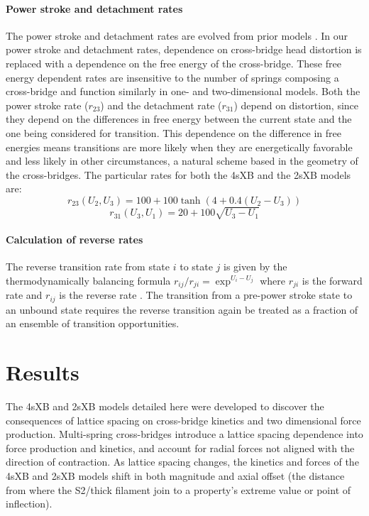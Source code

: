 \documentclass[]{article}
\begin{document}
\paragraph{Power stroke and detachment rates} %
The power stroke and detachment rates are evolved from prior models \citep{Pate1989, Tanner2007}. 
In our power stroke and detachment rates, dependence on cross-bridge head distortion is replaced with a dependence on the free energy of the cross-bridge.
These free energy dependent rates are insensitive to the number of springs composing a cross-bridge and function similarly in one- and two-dimensional models. 
Both the power stroke rate ($r_{23}$) and the detachment rate ($r_{31}$) depend on distortion, since they depend on the differences in free energy between the current state and the one being considered for transition.  
This dependence on the difference in free energies means transitions are more likely when they are energetically favorable and less likely in other circumstances, a natural scheme based in the geometry of the cross-bridges.
The particular rates for both the 4sXB and the 2sXB models are: 
$$r_{23}(U_2, U_3) = 100 + 100\tanh(4 + 0.4 (U_2 - U_3)) $$
$$r_{31}(U_3, U_1) = 20 + 100 \sqrt{U_3 - U_1} $$

\paragraph{Calculation of reverse rates} %
The reverse transition rate from state $i$ to state $j$ is given by the thermodynamically balancing formula $r_{ij}/r_{ji}=\exp^{U_i-U_j}$ where $r_{ji}$ is the forward rate and $r_{ij}$ is the reverse rate \citep{Pate1989, Daniel1998, Tanner2007}.
The transition from a pre-power stroke state to an unbound state requires the reverse transition again be treated as a fraction of an ensemble of transition opportunities. 



\section*{Results} %

The 4sXB and 2sXB models detailed here were developed to discover the consequences of lattice spacing on cross-bridge kinetics and two dimensional force production.
Multi-spring cross-bridges introduce a lattice spacing dependence into force production and kinetics, and account for radial forces not aligned with the direction of contraction. 
As lattice spacing changes, the kinetics and forces of the 4sXB and 2sXB models shift in both magnitude and axial offset (the distance from where the S2/thick filament join to a property's extreme value or point of inflection).
\end{document}
